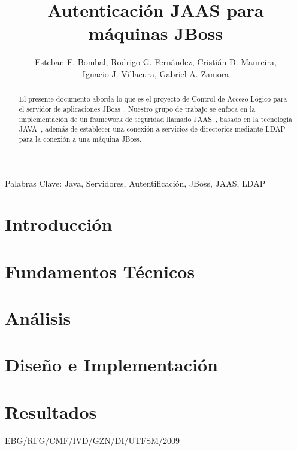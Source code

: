 \documentclass[letterpaper,12pt]{article}
\title{ Autenticación JAAS para máquinas JBoss}
\author{
Esteban F. Bombal,
Rodrigo G. Fernández,
Cristián D. Maureira,\\
Ignacio J. Villacura,
Gabriel A. Zamora
}
\begin{document}

\pagestyle{empty}

\maketitle\thispagestyle{empty}

\begin{abstract}
El presente documento aborda lo que es el proyecto de Control de Acceso Lógico para el
servidor de aplicaciones JBoss~\cite{JBOSS}. Nuestro grupo de trabajo se enfoca en la implementación de 
un framework de seguridad llamado JAAS~\cite{JAAS}, basado en la tecnología JAVA~\cite{JAVA}, además de establecer una conexión
a servicios de directorios mediante LDAP~\cite{OpenLDAP} para la conexión a una máquina JBoss.

\end{abstract}

Palabras Clave: Java, Servidores, Autentificación, JBoss, JAAS, LDAP

\newpage
\section{Introducción}
\label{sec:introduccion}


\section{Fundamentos Técnicos}
\label{sec:fundamentosTecnicos}


\section{Análisis}
\label{sec:analisis}


\section{Diseño e Implementación}
\label{sec:disenoImplementacion}


\section{Resultados}
\label{sec:resultados}



\vfill \hfill EBG/RFG/CMF/IVD/GZN/DI/UTFSM/2009
\end{document}
